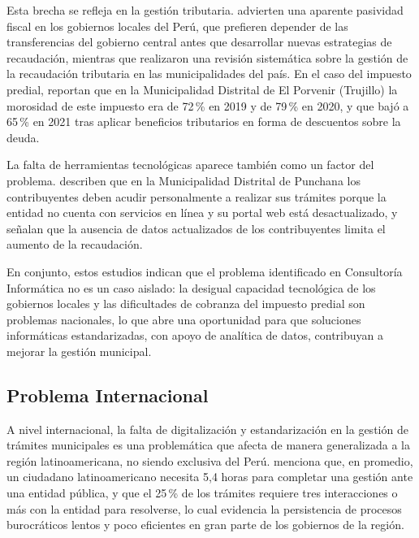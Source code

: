 \documentclass[12pt,a4paper]{report}
\begin{document}
Esta brecha se refleja en la gestión tributaria. \textcite{romerocarazas2021} advierten una aparente pasividad fiscal en los gobiernos locales del Perú, que prefieren depender de las transferencias del gobierno central antes que desarrollar nuevas estrategias de recaudación, mientras que \textcite{rojasbarbaran2021} realizaron una revisión sistemática sobre la gestión de la recaudación tributaria en las municipalidades del país. En el caso del impuesto predial, \textcite{riosvelasquez2022} reportan que en la Municipalidad Distrital de El Porvenir (Trujillo) la morosidad de este impuesto era de 72\,\% en 2019 y de 79\,\% en 2020, y que bajó a 65\,\% en 2021 tras aplicar beneficios tributarios en forma de descuentos sobre la deuda.

La falta de herramientas tecnológicas aparece también como un factor del problema. \textcite{soriadiaz2022} describen que en la Municipalidad Distrital de Punchana los contribuyentes deben acudir personalmente a realizar sus trámites porque la entidad no cuenta con servicios en línea y su portal web está desactualizado, y señalan que la ausencia de datos actualizados de los contribuyentes limita el aumento de la recaudación.

En conjunto, estos estudios indican que el problema identificado en Consultoría Informática no es un caso aislado: la desigual capacidad tecnológica de los gobiernos locales y las dificultades de cobranza del impuesto predial son problemas nacionales, lo que abre una oportunidad para que soluciones informáticas estandarizadas, con apoyo de analítica de datos, contribuyan a mejorar la gestión municipal. %

\subsection{Problema Internacional}

A nivel internacional, la falta de digitalización y estandarización en la gestión de trámites municipales es una problemática que afecta de manera generalizada a la región latinoamericana, no siendo exclusiva del Perú. \textcite{bid2018} menciona que, en promedio, un ciudadano latinoamericano necesita 5,4 horas para completar una gestión ante una entidad pública, y que el 25\,\% de los trámites requiere tres interacciones o más con la entidad para resolverse, lo cual evidencia la persistencia de procesos burocráticos lentos y poco eficientes en gran parte de los gobiernos de la región.
\end{document}
